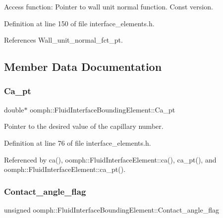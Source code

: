 Access function\+: Pointer to wall unit normal function. Const version. 



Definition at line 150 of file interface\+\_\+elements.\+h.



References Wall\+\_\+unit\+\_\+normal\+\_\+fct\+\_\+pt.



\subsection{Member Data Documentation}
\mbox{\label{classoomph_1_1FluidInterfaceBoundingElement_abf47719443253c1117705b0a20e9ef70}} 
\subsubsection{\texorpdfstring{Ca\+\_\+pt}{Ca\_pt}}
{\footnotesize\ttfamily double$\ast$ oomph\+::\+Fluid\+Interface\+Bounding\+Element\+::\+Ca\+\_\+pt\hspace{0.3cm}{\ttfamily [private]}}



Pointer to the desired value of the capillary number. 



Definition at line 76 of file interface\+\_\+elements.\+h.



Referenced by ca(), oomph\+::\+Fluid\+Interface\+Element\+::ca(), ca\+\_\+pt(), and oomph\+::\+Fluid\+Interface\+Element\+::ca\+\_\+pt().

\mbox{\label{classoomph_1_1FluidInterfaceBoundingElement_affa8d787e58ca23c2e73b4c8a2c30766}} 
\subsubsection{\texorpdfstring{Contact\+\_\+angle\+\_\+flag}{Contact\_angle\_flag}}
{\footnotesize\ttfamily unsigned oomph\+::\+Fluid\+Interface\+Bounding\+Element\+::\+Contact\+\_\+angle\+\_\+flag\hspace{0.3cm}{\ttfamily [protected]}}



